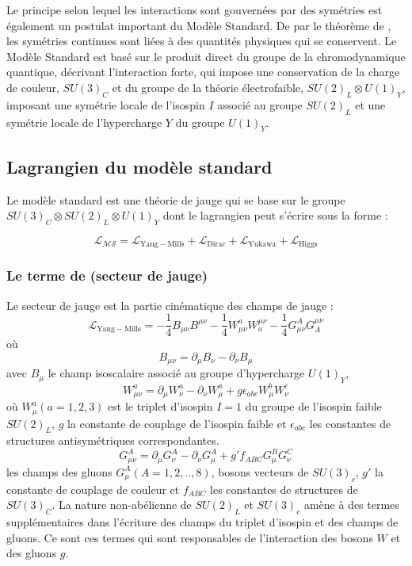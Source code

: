 Le principe selon lequel les interactions sont gouvernées par des symétries est également un postulat important du Modèle Standard. De par le théorème de , les symétries continues sont liées à des quantités physiques qui se conservent. Le Modèle Standard est basé sur le produit direct du groupe de la chromodynamique quantique, décrivant l'interaction forte, qui impose une conservation de la charge de couleur, $SU(3)_{C}$ et du groupe de la théorie électrofaible, $SU(2)_{L} \otimes U(1)_{Y}$, imposant une symétrie locale de l'isospin $I$ associé au groupe $SU(2)_{L}$ et une symétrie locale de l'hypercharge $Y$ du groupe $U(1)_{Y}$.

\subsection{Lagrangien du modèle standard}
Le modèle standard est une théorie de jauge qui se base sur le groupe $SU(3)_{C} \otimes SU(2)_{L} \otimes U(1)_{Y}$ dont le lagrangien peut s'écrire sous la forme :

\begin{equation}
\mathcal{L_{MS}}=\mathcal{L}_{\mathrm{Yang-Mills}}+\mathcal{L}_{\mathrm{Dirac}}+\mathcal{L}_{\mathrm{Yukawa}}+\mathcal{L}_{\mathrm{Higgs}}
\end{equation}

\subsubsection{Le terme de  (secteur de jauge)}
Le secteur de jauge est la partie cinématique des champs de jauge :
\begin{equation}
\mathcal{L}_{\mathrm{Yang-Mills}}=-\frac{1}{4}B_{\mu\nu}B^{\mu\nu}-\frac{1}{4}W_{\mu\nu}^{a}W_{a}^{\mu\nu}-\frac{1}{4}G_{\mu\nu}^{A}G_{A}^{\mu\nu}
\end{equation}
où 
\begin{equation}
B_{\mu\nu}=\partial_{\mu}B_{\nu}-\partial_{\nu}B_{\mu}
\end{equation}
avec $B_{\mu}$ le champ isoscalaire associé au groupe d'hypercharge $U(1)_{Y}$,
\begin{equation}
W_{\mu\nu}^{a}=\partial_{\mu}W_{\nu}^{a}-\partial_{\nu}W_{\mu}^{a}+g\epsilon_{abc}W_{\mu}^{b}W_{\nu}^{c}
\end{equation}
où $W_{\mu}^{a} (a=1,2,3)$ est le triplet d'isospin $I=\num{1}$ du groupe de l'isospin faible $SU(2)_{L}$, $g$ la constante de couplage de l'isospin faible et $\epsilon_{abc}$ les constantes de structures antisymétriques correspondantes.  
\begin{equation}
G_{\mu\nu}^{A}=\partial_{\mu}G_{\nu}^{A}-\partial_{\nu}G_{\mu}^{A}+g'f_{ABC}G_{\mu}^{B}G_{\nu}^{C}
\end{equation}
les champs des gluons $G_{\mu}^{A} (A=1,2,..,8)$, bosons vecteurs de $SU(3)_{c}$, $g'$ la constante de couplage de couleur et $f_{ABC}$ les constantes de structures de $SU(3)_{C}$.
La nature non-abélienne de $SU(2)_{L}$ et $SU(3)_{c}$ amène à des termes supplémentaires dans l'écriture des champs du triplet d'isospin et des champs de gluons. Ce sont ces termes qui sont responsables de l'interaction des bosons $W$ et des gluons $g$.

